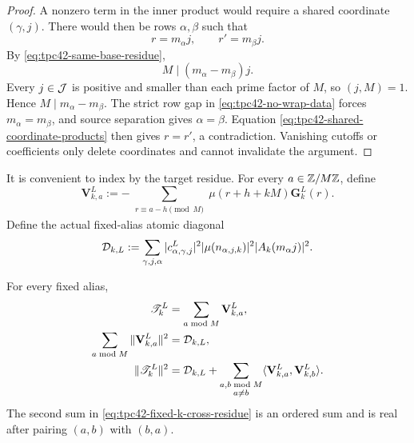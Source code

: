 \begin{proof}
A nonzero term in the inner product would require a shared coordinate
\((\gamma,j)\).  There would then be rows \(\alpha,\beta\) such that
\begin{equation}
 r=m_\alpha j,
 \qquad
 r'=m_\beta j.
 \label{eq:tpc42-shared-coordinate-products}
\end{equation}
By \eqref{eq:tpc42-same-base-residue},
\begin{equation}
 M\mid(m_\alpha-m_\beta)j.
 \label{eq:tpc42-M-divides-row-time}
\end{equation}
Every \(j\in\mathcal J\) is positive and smaller than each prime factor of
\(M\), so \((j,M)=1\).  Hence \(M\mid m_\alpha-m_\beta\).  The strict row
gap in \eqref{eq:tpc42-no-wrap-data} forces
\(m_\alpha=m_\beta\), and source separation gives
\(\alpha=\beta\).  Equation \eqref{eq:tpc42-shared-coordinate-products}
then gives \(r=r'\), a contradiction.  Vanishing cutoffs or coefficients
only delete coordinates and cannot invalidate the argument.
\end{proof}

It is convenient to index by the target residue.  For every
\(a\in\mathbb Z/M\mathbb Z\), define
\begin{equation}
 \mathbf V_{k,a}^L
 :=-\sum_{\substack{r\equiv a-h\!\!\!\pmod M}}
 \mu(r+h+kM)\mathbf G_k^L(r).
 \label{eq:tpc42-fixed-k-residue-packet}
\end{equation}
Define the actual fixed-alias atomic diagonal
\begin{equation}
 \mathcal D_{k,L}
 :=\sum_{\gamma,j,\alpha}
 |c^L_{\alpha,\gamma,j}|^2
 |\mu(n_{\alpha,j,k})|^2
 |A_k(m_\alpha j)|^2.
 \label{eq:tpc42-fixed-k-actual-diagonal}
\end{equation}

\begin{corollary}
\label{cor:tpc42-fixed-alias-packets}
For every fixed alias,
\begin{align}
 \mathscr T_k^L
 &=\sum_{a\bmod M}\mathbf V_{k,a}^L,
 \label{eq:tpc42-fixed-k-synthesis}\\
 \sum_{a\bmod M}\|\mathbf V_{k,a}^L\|^2
 &=\mathcal D_{k,L},
 \label{eq:tpc42-fixed-k-packed-diagonal}\\
 \|\mathscr T_k^L\|^2
 &=\mathcal D_{k,L}
   +\sum_{\substack{a,b\bmod M\\a\ne b}}
    \langle\mathbf V_{k,a}^L,\mathbf V_{k,b}^L\rangle.
 \label{eq:tpc42-fixed-k-cross-residue}
\end{align}
The second sum in \eqref{eq:tpc42-fixed-k-cross-residue} is an ordered
sum and is real after pairing \((a,b)\) with \((b,a)\).
\end{corollary}

